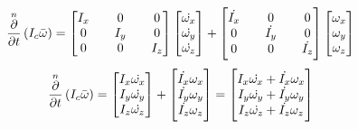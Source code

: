 \documentclass[class=report, 12pt, crop=false]{standalone}
\begin{document}
\begin{center}
$$\overset{n}{\frac{\partial}{\partial t}}\left(I_c \bar{\omega}\right) = 
\begin{bmatrix}
I_x && 0 && 0 \\
0 && I_y && 0 \\
0 && 0 && I_z
\end{bmatrix}\begin{bmatrix}
\dot{\omega_x} \\ \dot{\omega_y} \\ \dot{\omega_z}
\end{bmatrix}
+ \begin{bmatrix}
\dot{I_x} && 0 && 0 \\
0 && \dot{I_y} && 0 \\
0 && 0 && \dot{I_z}
\end{bmatrix}\begin{bmatrix}
\omega_x \\ \omega_y \\ \omega_z
\end{bmatrix}$$
$$\overset{n}{\frac{\partial}{\partial t}}\left(I_c \bar{\omega}\right) = 
\begin{bmatrix}
I_x\dot{\omega_x} \\
I_y\dot{\omega_y} \\
I_z\dot{\omega_z}
\end{bmatrix} + \begin{bmatrix}
\dot{I_x}\omega_x \\
\dot{I_y}\omega_y \\
\dot{I_z}\omega_z
\end{bmatrix} = \begin{bmatrix}
I_x\dot{\omega_x}+\dot{I_x}\omega_x \\
I_y\dot{\omega_y}+\dot{I_y}\omega_y \\
I_z\dot{\omega_z}+\dot{I_z}\omega_z
\end{bmatrix}$$


\end{center}
\end{document}
